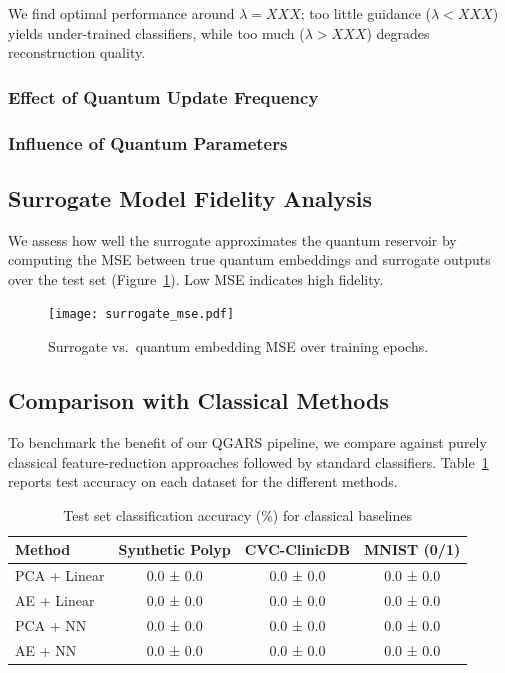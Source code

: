 \documentclass[conference]{IEEEtran}
\begin{document}
\noindent
We find optimal performance around $\lambda=XXX$; too little guidance ($\lambda<XXX$) yields under-trained classifiers, while too much ($\lambda>XXX$) degrades reconstruction quality.


\subsubsection{Effect of Quantum Update Frequency}

\subsubsection{Influence of Quantum Parameters}

\subsection{Surrogate Model Fidelity Analysis}
We assess how well the surrogate approximates the quantum reservoir by 
computing the MSE between true quantum embeddings and surrogate outputs over the test set (Figure~\ref{fig:surrogate_fidelity}). Low MSE indicates high fidelity.

\begin{figure}[!ht]
  \centering
  \texttt{[image: surrogate\_mse.pdf]}
  \caption{Surrogate vs.\ quantum embedding MSE over training epochs.}
  \label{fig:surrogate_fidelity}
\end{figure}


\subsection{Comparison with Classical Methods}
To benchmark the benefit of our QGARS pipeline, 
we compare against purely classical feature-reduction 
approaches followed by standard classifiers. 
Table~\ref{tab:classical_comp} reports test accuracy on each dataset 
for the different methods.

\begin{table}[ht]
  \caption{Test set classification accuracy (\%) for classical baselines}
  \label{tab:classical_comp}
  \centering
  \begin{tabular}{lccc}
    \hline
    Method            & Synthetic Polyp & CVC-ClinicDB & MNIST (0/1) \\
    \hline
    PCA + Linear      &  0.0 ± 0.0     &  0.0 ± 0.0   &  0.0 ± 0.0    \\
    AE + Linear       &  0.0 ± 0.0     &  0.0 ± 0.0   &  0.0 ± 0.0    \\
    PCA + NN          &  0.0 ± 0.0     &  0.0 ± 0.0   &  0.0 ± 0.0    \\
    AE + NN           &  0.0 ± 0.0     &  0.0 ± 0.0   &  0.0 ± 0.0    \\
    \hline
  \end{tabular}
\end{table}
\end{document}
